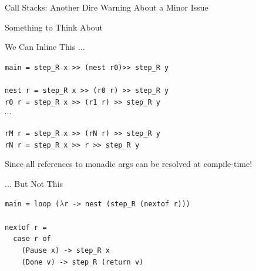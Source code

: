 \documentclass{beamer}
\begin{document}
\begin{frame}{Call Stacks: Another Dire Warning About a Minor Issue}
{\begin{structure}{Something to Think About}
\begin{itemize}
\end{itemize}
\end{structure}

} %

\begin{structure}{We Can Inline This ...}

\begin{center}

\begin{onlinebox}{7cm}

\begin{scriptsize}

\texttt{main = step\_R x >> (nest r0)>> step\_R y}\\
\ \\
\texttt{nest r = step\_R x >> (r0 r) >> step\_R y}\\
\texttt{r0 r = step\_R x >> (r1 r) >> step\_R y}\\

$\cdots$

\texttt{rM r = step\_R x >> (rN r) >> step\_R y}\\

\texttt{rN r = step\_R x >> r >> step\_R y}\\

\end{scriptsize}

\end{onlinebox}\end{center}\small{Since all references to monadic args can be resolved at compile-time!}

\end{structure}

\smallskip

\begin{structure}{... But Not This}

\begin{center}
\begin{onlinebox}{8cm}

\begin{scriptsize}
\begin{flushleft}

\texttt{main = loop ($\lambda$r -> nest (step\_R (nextof r)))}\\
\ \\
\texttt{nextof r =}\\
\texttt{\ \ case r of}\\
\texttt{\ \ \ \ (Pause x) -> step\_R x}\\
\texttt{\ \ \ \ (Done v) -> step\_R (return v)}\\


\end{flushleft}
\end{scriptsize}
\end{onlinebox}
\end{center}
\end{structure}
\end{frame}
\end{document}
